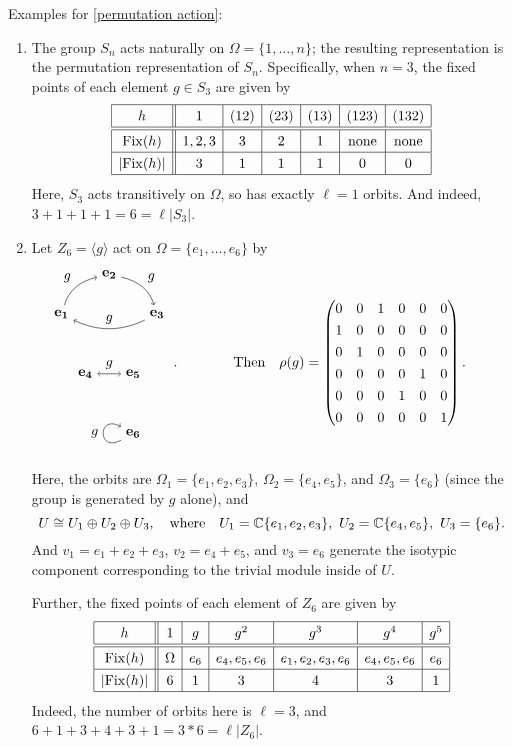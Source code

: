 \documentclass[11pt, reqno]{amsart}
\theoremstyle{plain}
\theoremstyle{definition}
\theoremstyle{example}
\newcommand\TikZ[1]{\begin{matrix}\begin{tikzpicture}#1\end{tikzpicture}\end{matrix}}
\def\<{\langle} \def\>{\rangle}
\def\Fix{\mathrm{Fix}}
\begin{document}
Examples for \ref{permutation action}: 
\begin{enumerate}
\item The group $S_n$ acts naturally on $\Omega = \{1, \dots, n\}$; the resulting representation is the permutation representation of $S_n$. Specifically, when $n = 3$, the fixed points of each element $g \in S_3$ are given by 
$$\def\arraystretch{1.3}\begin{array}{|c||c|c|c|c|c|c|}\hline
h & 1 & (12) & (23) & (13) & (123) & (132) \\\hline\hline
\Fix(h) &1,2,3 & 3 & 2 & 1 & \text{none}& \text{none}\\\hline
|\Fix(h)| & 3 & 1 & 1 & 1 & 0 & 0\\\hline
\end{array}$$
Here, $S_3$ acts transitively on $\Omega$, so has exactly $\ell = 1$ orbits. And indeed, $3 + 1 + 1 + 1 = 6 = \ell|S_3|$. 

\item Let $Z_6 = \<g\>$ act on $\Omega = \{e_1, \dots,  e_6\}$ by 
$$\TikZ{[xscale=1.2] \foreach \x/\y in {1/0,2/1,3/0}{\node (\x) at (\x,\y) {$\mathbf{e_\x}$};} 
	\draw[->] (1) to [bend left] node[above left]{$g$} (2);
	\draw[->] (2) to [bend left] node[above right]{$g$} (3);
	\draw[->] (3) to [bend left] node[above]{$g$} (1);
	\foreach \x/\y in {4/1.5, 5/2.5}{\node (\x) at (\y,-1.5) {$\mathbf{e_\x}$};} 
	\draw[<->] (4) to node[above]{$g$} (5); 
	\node (6) at (2.5,-3) {$\mathbf{e_6}$}; \draw[->] (6) ..  controls +(-.75,-.5) and +(-.75,.5) .. node[left]{$g$}(6);
	}\ .
\qquad\qquad\text{Then} \quad  \rho(g) = \begin{pmatrix} 0 & 0 & 1 & 0& 0& 0\\1 & 0 & 0& 0& 0& 0\\0&1&0& 0& 0& 0\\0 & 0 & 0 & 0 & 1& 0\\ 0 & 0 & 0 & 1 & 0 & 0 \\ 0 & 0 & 0 & 0 & 0 & 1\end{pmatrix}. \qquad
$$
Here, the orbits are $\Omega_1 = \{e_1, e_2, e_3\}$, $\Omega_2 = \{e_4, e_5\}$, and $\Omega_3 = \{e_6\}$ (since the group is generated by $g$ alone), and 
$$U \cong U_1 \oplus U_2 \oplus U_3, \quad \text{where} \quad U_1=\mathbb{C}\{e_1, e_2, e_3\},\ U_2=\mathbb{C}\{e_4, e_5\},\ U_3 = \{e_6\}.$$
And $v_1 = e_1 + e_2 + e_3$, $v_2 = e_4 + e_5$, and $v_3 = e_6$ generate the isotypic component corresponding to the trivial module inside of $U$. 

Further, the fixed points of each element of $Z_6$ are given by 
$$\def\arraystretch{1.3}\begin{array}{|c||c|c|c|c|c|c|}\hline
h & 1 & g & g^2 & g^3 & g^4 & g^5 \\\hline\hline
\Fix(h) & \Omega & e_6 & e_4, e_5, e_6 & e_1, e_2, e_3, e_6 & e_4, e_5, e_6 & e_6\\\hline
|\Fix(h)| & 6 & 1 & 3 &4 & 3 & 1\\\hline
\end{array}$$
Indeed, the number of orbits here is $\ell = 3$, and $6+1+3+4+3+1 = 3*6 = \ell|Z_6|$. 
\end{enumerate}
\end{document}
